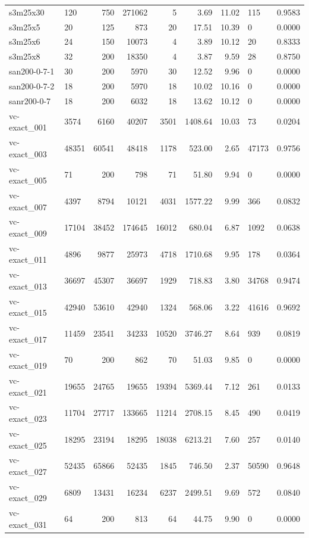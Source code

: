 \begin{longtable}{llrrrrrll}
s3m25x30 & 120 & 750 & 271062 & 5 & 3.69 & 11.02 & 115 & 0.9583 \\
s3m25x5 & 20 & 125 & 873 & 20 & 17.51 & 10.39 & 0 & 0.0000 \\
s3m25x6 & 24 & 150 & 10073 & 4 & 3.89 & 10.12 & 20 & 0.8333 \\
s3m25x8 & 32 & 200 & 18350 & 4 & 3.87 & 9.59 & 28 & 0.8750 \\
san200-0-7-1 & 30 & 200 & 5970 & 30 & 12.52 & 9.96 & 0 & 0.0000 \\
san200-0-7-2 & 18 & 200 & 5970 & 18 & 10.02 & 10.16 & 0 & 0.0000 \\
sanr200-0-7 & 18 & 200 & 6032 & 18 & 13.62 & 10.12 & 0 & 0.0000 \\
vc-exact\_001 & 3574 & 6160 & 40207 & 3501 & 1408.64 & 10.03 & 73 & 0.0204 \\
vc-exact\_003 & 48351 & 60541 & 48418 & 1178 & 523.00 & 2.65 & 47173 & 0.9756 \\
vc-exact\_005 & 71 & 200 & 798 & 71 & 51.80 & 9.94 & 0 & 0.0000 \\
vc-exact\_007 & 4397 & 8794 & 10121 & 4031 & 1577.22 & 9.99 & 366 & 0.0832 \\
vc-exact\_009 & 17104 & 38452 & 174645 & 16012 & 680.04 & 6.87 & 1092 & 0.0638 \\
vc-exact\_011 & 4896 & 9877 & 25973 & 4718 & 1710.68 & 9.95 & 178 & 0.0364 \\
vc-exact\_013 & 36697 & 45307 & 36697 & 1929 & 718.83 & 3.80 & 34768 & 0.9474 \\
vc-exact\_015 & 42940 & 53610 & 42940 & 1324 & 568.06 & 3.22 & 41616 & 0.9692 \\
vc-exact\_017 & 11459 & 23541 & 34233 & 10520 & 3746.27 & 8.64 & 939 & 0.0819 \\
vc-exact\_019 & 70 & 200 & 862 & 70 & 51.03 & 9.85 & 0 & 0.0000 \\
vc-exact\_021 & 19655 & 24765 & 19655 & 19394 & 5369.44 & 7.12 & 261 & 0.0133 \\
vc-exact\_023 & 11704 & 27717 & 133665 & 11214 & 2708.15 & 8.45 & 490 & 0.0419 \\
vc-exact\_025 & 18295 & 23194 & 18295 & 18038 & 6213.21 & 7.60 & 257 & 0.0140 \\
vc-exact\_027 & 52435 & 65866 & 52435 & 1845 & 746.50 & 2.37 & 50590 & 0.9648 \\
vc-exact\_029 & 6809 & 13431 & 16234 & 6237 & 2499.51 & 9.69 & 572 & 0.0840 \\
vc-exact\_031 & 64 & 200 & 813 & 64 & 44.75 & 9.90 & 0 & 0.0000 \\

\end{longtable}
